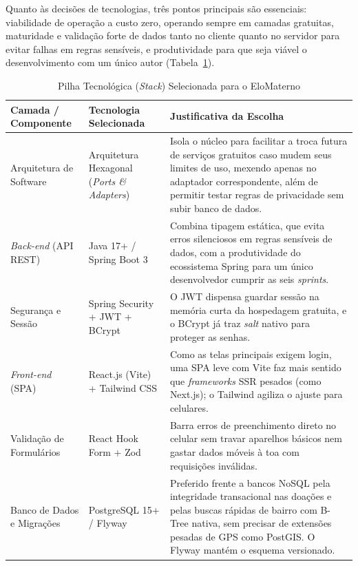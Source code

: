 Quanto às decisões de tecnologias, três pontos principais são essenciais: viabilidade de operação a custo zero, operando sempre em camadas gratuitas, maturidade e validação forte de dados tanto no cliente quanto no servidor para evitar falhas em regras sensíveis, e produtividade para que seja viável o desenvolvimento com um único autor (Tabela~\ref{tab:stack}).

\begin{table}[H]
\centering
\singlespacing
\caption{Pilha Tecnológica (\textit{Stack}) Selecionada para o EloMaterno}
\label{tab:stack}
\small
\begin{tabular}{p{3.3cm}p{3.9cm}p{7.5cm}}
\toprule
\textbf{Camada / Componente} & \textbf{Tecnologia Selecionada} & \textbf{Justificativa da Escolha} \\
\midrule
Arquitetura de Software & Arquitetura Hexagonal (\textit{Ports \& Adapters}) & Isola o núcleo para facilitar a troca futura de serviços gratuitos caso mudem seus limites de uso, mexendo apenas no adaptador correspondente, além de permitir testar regras de privacidade sem subir banco de dados. \\
\addlinespace[3pt]
\textit{Back-end} (API REST) & Java 17+ / Spring Boot 3 & Combina tipagem estática, que evita erros silenciosos em regras sensíveis de dados, com a produtividade do ecossistema Spring para um único desenvolvedor cumprir as seis \textit{sprints}. \\
\addlinespace[3pt]
Segurança e Sessão & Spring Security + JWT + BCrypt & O JWT dispensa guardar sessão na memória curta da hospedagem gratuita, e o BCrypt já traz \textit{salt} nativo para proteger as senhas. \\
\addlinespace[3pt]
\textit{Front-end} (SPA) & React.js (Vite) + Tailwind CSS & Como as telas principais exigem login, uma SPA leve com Vite faz mais sentido que \textit{frameworks} SSR pesados (como Next.js); o Tailwind agiliza o ajuste para celulares. \\
\addlinespace[3pt]
Validação de Formulários & React Hook Form + Zod & Barra erros de preenchimento direto no celular sem travar aparelhos básicos nem gastar dados móveis à toa com requisições inválidas. \\
\addlinespace[3pt]
Banco de Dados e Migrações & PostgreSQL 15+ / Flyway & Preferido frente a bancos NoSQL pela integridade transacional nas doações e pelas buscas rápidas de bairro com B-Tree nativa, sem precisar de extensões pesadas de GPS como PostGIS. O Flyway mantém o esquema versionado. \\

\end{tabular}
\end{table}
